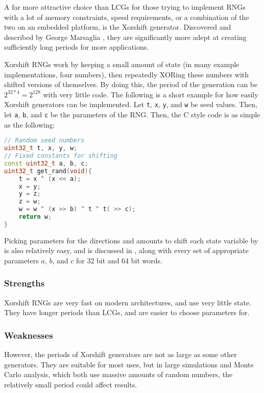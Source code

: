 A far more attractive choice than LCGs for those trying to implement RNGs with a lot of memory constraints, speed requirements, or a combination of the two on an embedded platform, is the Xorshift generator. Discovered and described by George Marsaglia \cite{marsaglia2003xorshift}, they are significantly more adept at creating sufficiently long periods for more applications.

Xorshift RNGs work by keeping a small amount of state (in many example implementations, four numbers), then repeatedly XORing these numbers with shifted versions of themselves. By doing this, the period of the generation can be $2^{32 * 4} = 2^{128}$ with very little code. The following is a short example for how easily Xorshift generators can be implemented. Let \texttt{t}, \texttt{x}, \texttt{y}, and \texttt{w} be seed values. Then, let \texttt{a}, \texttt{b}, and \texttt{c} be the parameters of the RNG. Then, the C style code is as simple as the following:

\begin{lstlisting}[frame=single,language=C++,basicstyle=\ttfamily]
// Random seed numbers
uint32_t t, x, y, w;
// Fixed constants for shifting
const uint32_t a, b, c;
uint32_t get_rand(void){
    t = x ^ (x << a);
    x = y;
    y = z;
    z = w;
    w = w ^ (x >> b) ^ t ^ t( >> c);
    return w;
}
\end{lstlisting}

Picking parameters for the directions and amounts to shift each state variable by is also relatively easy, and is discussed in \cite{marsaglia2003xorshift}, along with every set of appropriate parameters $a$, $b$, and $c$ for 32 bit and 64 bit words.

\subsubsection{Strengths}

Xorshift RNGs are very fast on modern architectures, and use very little state. They have longer periods than LCGs, and are easier to choose parameters for.

\subsubsection{Weaknesses}

However, the periods of Xorshift generators are not as large as some other generators. They are suitable for most uses, but in large simulations and Monte Carlo analysis, which both use massive amounts of random numbers, the relatively small period could affect results.
